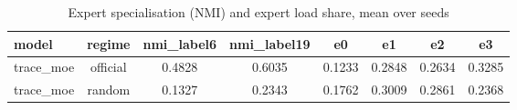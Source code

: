 \begin{table}[htbp]
\centering
\caption{Expert specialisation (NMI) and expert load share, mean over seeds}
\label{tab:expert_routing}
\begin{tabular}{lccccccc}
\toprule
model & regime & nmi\_label6 & nmi\_label19 & e0 & e1 & e2 & e3 \\
\midrule
trace\_moe & official & 0.4828 & 0.6035 & 0.1233 & 0.2848 & 0.2634 & 0.3285 \\
trace\_moe & random & 0.1327 & 0.2343 & 0.1762 & 0.3009 & 0.2861 & 0.2368 \\
\bottomrule
\end{tabular}
\end{table}